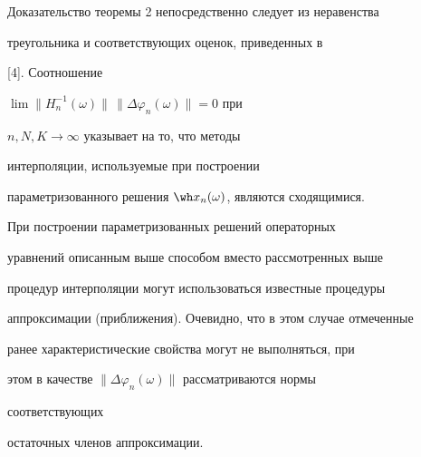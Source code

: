 Доказательство теоремы 2 непосредственно следует из неравенства


треугольника и соответствующих оценок, приведенных в


[4]. Соотношение


$\lim\|H^{-1}_n(\omega)\|\,\|\Delta\varphi_n(\omega)\|=0$ при


$n,N,K\to\infty$ указывает на то, что методы


интерполяции, используемые при построении


параметризованного решения $\wh x_n(\omega)$, являются сходящимися.





\begin{note} При построении параметризованных решений операторных


уравнений описанным выше способом вместо рассмотренных выше


процедур интерполяции могут использоваться известные процедуры


аппроксимации (приближения). Очевидно, что в этом случае отмеченные


ранее характеристические свойства могут не выполняться, при


этом в качестве $\|\Delta\varphi_n(\omega)\|$ рассматриваются нормы


соответствующих


остаточных членов аппроксимации.


\end{note}





